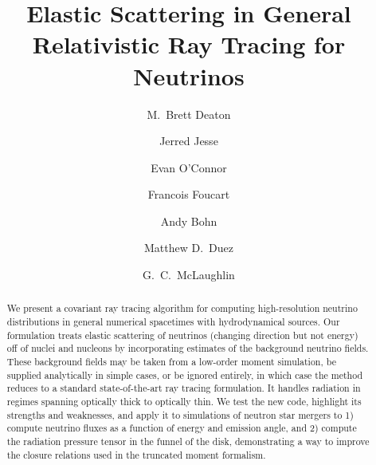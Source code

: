 \documentclass[aps,prd,twocolumn,superscriptaddress]{revtex4-1}
\begin{document}
\widetext
{}

\title{Elastic Scattering in General Relativistic Ray Tracing for Neutrinos}

\author{M.\ Brett Deaton}

\author{Jerred Jesse}

\author{Evan O'Connor}

\author{Francois Foucart}

\author{Andy Bohn}

\author{Matthew D.\ Duez}

\author{G.\ C.\ McLaughlin}


\begin{abstract}
  We present a covariant ray tracing algorithm for computing high-resolution
  neutrino distributions in general numerical spacetimes with hydrodynamical
  sources.
  Our formulation treats elastic scattering of neutrinos (changing direction
  but not energy) off of nuclei and
  nucleons by incorporating estimates of the background neutrino fields.
  These background fields may be taken from a low-order moment simulation,
  be supplied analytically in simple cases,
  or be ignored entirely, in which case the method
  reduces to a standard state-of-the-art ray tracing formulation.
  It handles radiation in regimes spanning optically thick to optically thin.
  We test the new code, highlight its strengths and weaknesses, and
  apply it to simulations of neutron star mergers to
  1) compute neutrino fluxes as a function of energy and emission angle, and
  2) compute the radiation pressure tensor in the funnel of the disk,
  demonstrating a way to improve the closure relations used in the truncated
  moment formalism.
\end{abstract}
\end{document}
